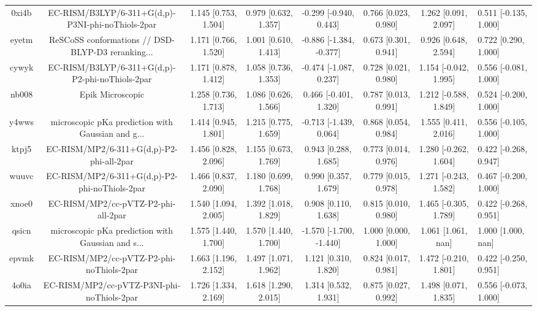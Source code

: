 \documentclass{article}
\begin{document}
\begin{center}
\begin{longtable}{|ccccccc|}
 0xi4b &  EC-RISM/B3LYP/6-311+G(d,p)-P3NI-phi-noThiols-2par &     1.145 [0.753, 1.504] &     0.979 [0.632, 1.357] &   -0.299 [-0.940, 0.443] &  0.766 [0.023, 0.980] &    1.262 [0.091, 2.097] &  0.511 [-0.135, 1.000] \\
 eyetm &  ReSCoSS conformations // DSD-BLYP-D3 reranking... &     1.171 [0.766, 1.520] &     1.001 [0.610, 1.413] &  -0.886 [-1.384, -0.377] &  0.673 [0.301, 0.941] &    0.926 [0.648, 2.594] &   0.722 [0.290, 1.000] \\
 cywyk &    EC-RISM/B3LYP/6-311+G(d,p)-P2-phi-noThiols-2par &     1.171 [0.878, 1.412] &     1.058 [0.736, 1.353] &   -0.474 [-1.087, 0.237] &  0.728 [0.021, 0.980] &   1.154 [-0.042, 1.995] &  0.556 [-0.081, 1.000] \\
 nb008 &                                   Epik Microscopic &     1.258 [0.736, 1.713] &     1.086 [0.626, 1.566] &    0.466 [-0.401, 1.320] &  0.787 [0.013, 0.991] &   1.212 [-0.588, 1.849] &  0.524 [-0.200, 1.000] \\
 y4wws &  microscopic pKa prediction with Gaussian and g... &     1.414 [0.945, 1.801] &     1.215 [0.775, 1.659] &   -0.713 [-1.439, 0.064] &  0.868 [0.054, 0.984] &    1.555 [0.411, 2.016] &  0.556 [-0.105, 1.000] \\
 ktpj5 &           EC-RISM/MP2/6-311+G(d,p)-P2-phi-all-2par &     1.456 [0.828, 2.096] &     1.155 [0.673, 1.769] &     0.943 [0.288, 1.685] &  0.773 [0.014, 0.976] &   1.280 [-0.262, 1.604] &  0.422 [-0.268, 0.947] \\
 wuuvc &      EC-RISM/MP2/6-311+G(d,p)-P2-phi-noThiols-2par &     1.466 [0.837, 2.090] &     1.180 [0.699, 1.768] &     0.990 [0.357, 1.679] &  0.779 [0.015, 0.978] &   1.271 [-0.243, 1.582] &  0.467 [-0.200, 1.000] \\
 xnoe0 &                EC-RISM/MP2/cc-pVTZ-P2-phi-all-2par &     1.540 [1.094, 2.005] &     1.392 [1.018, 1.829] &     0.908 [0.110, 1.638] &  0.815 [0.010, 0.980] &   1.465 [-0.305, 1.789] &  0.422 [-0.268, 0.951] \\
 qsicn &  microscopic pKa prediction with Gaussian and s... &     1.575 [1.440, 1.700] &     1.570 [1.440, 1.700] &  -1.570 [-1.700, -1.440] &  1.000 [0.000, 1.000] &      1.061 [1.061, nan] &     1.000 [1.000, nan] \\
 epvmk &           EC-RISM/MP2/cc-pVTZ-P2-phi-noThiols-2par &     1.663 [1.196, 2.152] &     1.497 [1.071, 1.962] &     1.121 [0.310, 1.820] &  0.824 [0.017, 0.981] &   1.472 [-0.210, 1.801] &  0.422 [-0.250, 0.951] \\
 4o0ia &         EC-RISM/MP2/cc-pVTZ-P3NI-phi-noThiols-2par &     1.726 [1.334, 2.169] &     1.618 [1.290, 2.015] &     1.314 [0.532, 1.931] &  0.875 [0.027, 0.992] &    1.498 [0.071, 1.835] &  0.556 [-0.073, 1.000] \\

\end{longtable}
\end{center}
\end{document}
